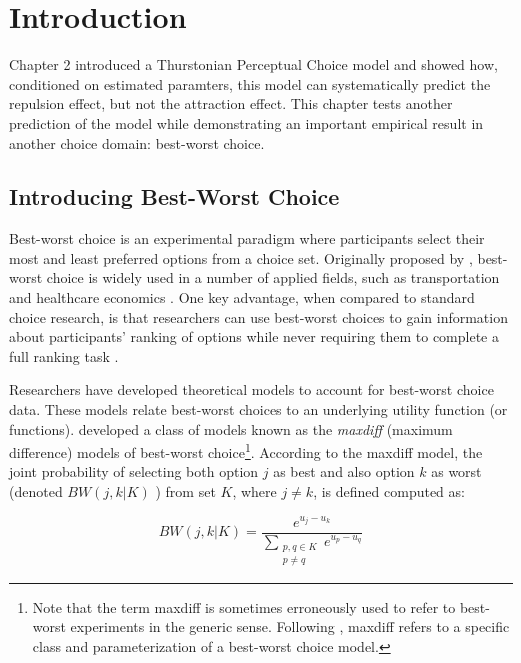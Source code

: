 \section{Introduction}

Chapter 2 introduced a Thurstonian Perceptual Choice model and showed how, conditioned on estimated paramters, this model can systematically predict the repulsion effect, but not the attraction effect. This chapter tests another prediction of the model while demonstrating an important empirical result in another choice domain: best-worst choice.

\subsection{Introducing Best-Worst Choice}

Best-worst choice is an experimental paradigm where participants select their most and least preferred options from a choice set. Originally proposed by \textcite{finn1992determining}, best-worst choice is widely used in a number of applied fields, such as transportation \parencite{beck2016best} and healthcare economics \parencite{cheung2016using,flynn2007best,muhlbacher2016experimental}. One key advantage, when compared to standard choice research, is that researchers can use best-worst choices to gain information about participants' ranking of options while never requiring them to complete a full ranking task \parencite{flynn2014best}.

Researchers have developed theoretical models to account for best-worst choice data. These models relate best-worst choices to an underlying utility function (or functions). \textcite{marleyProbabilisticModelsBest2005} developed a class of models known as the \textit{maxdiff} (maximum difference) models of best-worst choice\footnote{Note that the term maxdiff is sometimes erroneously used to refer to best-worst experiments in the generic sense. Following \textcite{marleyProbabilisticModelsBest2005}, maxdiff refers to a specific class and parameterization of a best-worst choice model.}. According to the maxdiff model, the joint probability of selecting both option $j$ as best and also option $k$ as worst (denoted $BW(j,k|K)$ ) from set $K$, where $j \neq k$, is defined computed as:

\begin{equation}
   BW(j,k|K)=\frac{e^{u_{j}-u_{k}}}{\sum_{\substack{{p,q}\in K\\p \neq q}} e^{u_{p}-u_{q}}}   
   \label{eqn:maxdiff_equation_joint}
\end{equation}

